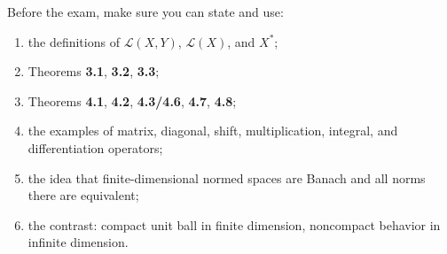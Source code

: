 \documentclass[header={Lecture 2 Exam Study Notes}]{study-note}
\begin{document}
\begin{focusbox}
Before the exam, make sure you can state and use:
\begin{enumerate}
\item the definitions of $\mathcal L(X,Y)$, $\mathcal L(X)$, and $X^*$;
\item Theorems \textbf{3.1}, \textbf{3.2}, \textbf{3.3};
\item Theorems \textbf{4.1}, \textbf{4.2}, \textbf{4.3/4.6}, \textbf{4.7}, \textbf{4.8};
\item the examples of matrix, diagonal, shift, multiplication, integral, and differentiation operators;
\item the idea that finite-dimensional normed spaces are Banach and all norms there are equivalent;
\item the contrast: compact unit ball in finite dimension, noncompact behavior in infinite dimension.
\end{enumerate}
\end{focusbox}
\end{document}
